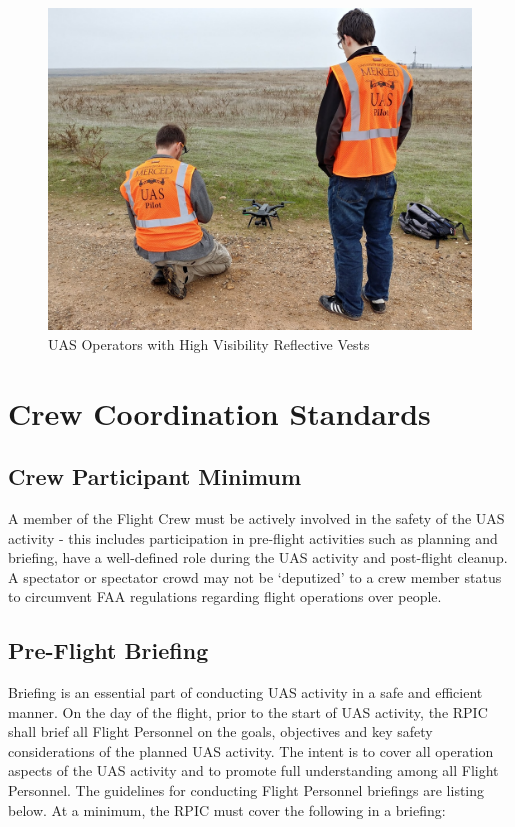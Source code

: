 \documentclass[
]{book}
\begin{document}
\begin{figure}

{\centering \includegraphics[width=0.6\linewidth]{images/UAS_Vest} 

}

\caption{UAS Operators with High Visibility Reflective Vests}\label{fig:UASvests}
\end{figure}

\hypertarget{ch-crm}{%
\chapter{Crew Coordination Standards}\label{ch-crm}}

\hypertarget{crew-participant-minimum}{%
\section{Crew Participant Minimum}\label{crew-participant-minimum}}

A member of the Flight Crew must be actively involved in the safety of the UAS activity - this includes participation in pre-flight activities such as planning and briefing, have a well-defined role during the UAS activity and post-flight cleanup. A spectator or spectator crowd may not be `deputized' to a crew member status to circumvent FAA regulations regarding flight operations over people.

\hypertarget{pfb}{%
\section{Pre-Flight Briefing}\label{pfb}}

Briefing is an essential part of conducting UAS activity in a safe and efficient manner. On the day of the flight, prior to the start of UAS activity, the RPIC shall brief all Flight Personnel on the goals, objectives and key safety considerations of the planned UAS activity. The intent is to cover all operation aspects of the UAS activity and to promote full understanding among all Flight Personnel. The guidelines for conducting Flight Personnel briefings are listing below. At a minimum, the RPIC must cover the following in a briefing:
\end{document}

